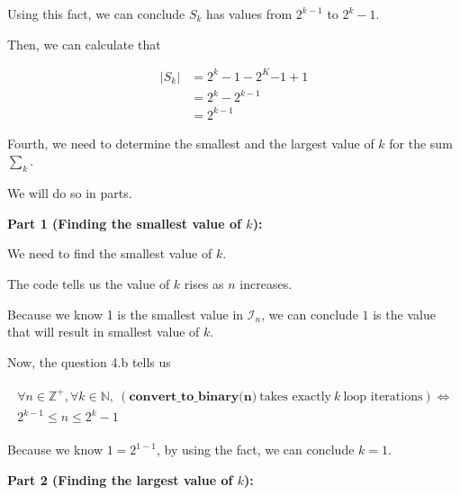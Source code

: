 \documentclass[12pt]{article}
\begin{document}
\begin{enumerate}[a.]
    \bigskip

    Using this fact, we can conclude $S_k$ has values from $2^{k-1}$ to $2^k - 1$.

    \bigskip

    Then, we can calculate that

    \begin{align}
        \lvert S_k \rvert &= 2^k -1 - 2^K{-1} + 1\\
        &= 2^k - 2^{k-1}\\
        &= 2^{k-1}
    \end{align}

    \bigskip

    Fourth, we need to determine the smallest and the largest value of $k$
    for the sum $\sum\limits_{k}$.

    \bigskip

    We will do so in parts.

    \bigskip

    \textbf{Part 1 (Finding the smallest value of $k$):}

    \bigskip

    We need to find the smallest value of $k$.

    \bigskip

    The code tells us the value of $k$ rises as $n$ increases.

    \bigskip

    Because we know 1 is the smallest value in $\mathcal{I}_n$, we can conclude
    $1$ is the value that will result in smallest value of $k$.

    \bigskip

    Now, the question 4.b tells us

    \begin{align}
        \begin{split}
        \forall n \in \mathbb{Z}^+, \forall k \in \mathbb{N},\: (\textbf{
        convert\_to\_binary(n)}\:\text{takes exactly}\:k\:\text{loop iterations}) \Leftrightarrow
        \\ 2^{k-1} \leq n \leq 2^k -1
        \end{split}
    \end{align}

    Because we know $1 = 2^{1 - 1}$, by using the fact, we can conclude $k = 1$.

    \bigskip

    \textbf{Part 2 (Finding the largest value of $k$):}

    \bigskip


\end{enumerate}
\end{document}
